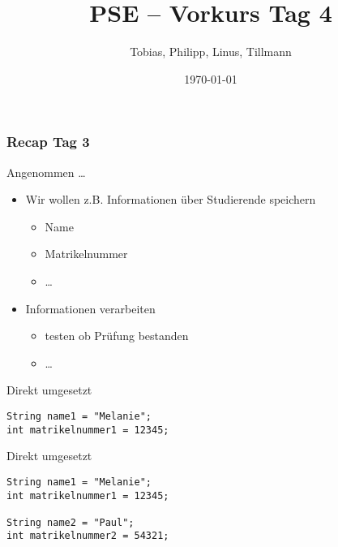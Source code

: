 \documentclass{../../presentation}
\title{PSE – Vorkurs Tag 4}
\author{Tobias, Philipp, Linus, Tillmann}
\institute{FIUS - Fachgruppe Informatik Universität Stuttgart}
\date{\today}
\begin{document}
\begin{frame}
	\titlepage
\end{frame}

\begin{frame}
	\listoftodos
\end{frame}

\begin{frame}
	\frametitle{Recap Tag 3}
\end{frame}



\begin{frame}{Angenommen \dots}
	\begin{itemize}
		\item Wir wollen z.B. Informationen über Studierende speichern
		      \begin{itemize}
			      \item<2->[\textbullet] Name
			      \item<3->[\textbullet] Matrikelnummer
			      \item<4->[\textbullet] \dots
		      \end{itemize}
		\item<5-> Informationen verarbeiten
		      \begin{itemize}
			      \item<6->[\textbullet] testen ob Prüfung bestanden
			      \item<7->[\textbullet] \dots
		      \end{itemize}
	\end{itemize}
\end{frame}



\begin{frame}[fragile,t]{Direkt umgesetzt}
	\vspace{2.0em}
	\begin{minipage}[t][0.6\textheight][t]{\textwidth}
		\begin{verbatim}
String name1 = "Melanie";
int matrikelnummer1 = 12345;
\end{verbatim}
	\end{minipage}
\end{frame}



\begin{frame}[fragile,t]{Direkt umgesetzt}
	\vspace{2.0em}
	\begin{minipage}[t][0.6\textheight][t]{\textwidth}
		\begin{verbatim}
String name1 = "Melanie";
int matrikelnummer1 = 12345;

String name2 = "Paul";
int matrikelnummer2 = 54321;
\end{verbatim}
	\end{minipage}
\end{frame}
\end{document}
